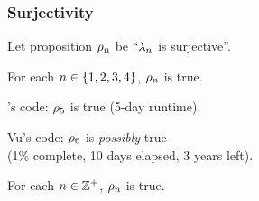 \documentclass[letterpaper, 14pt]{extarticle}
\begin{document}
\begin{flushleft}

\subsubsection{Surjectivity}

\begin{definition}
Let proposition $\rho_{n}$ be ``$\lambda_{n}$ is surjective''.
\end{definition}

\begin{remark}
For each $n \in \{1, 2, 3, 4\}$, $\rho_{n}$ is true.
\end{remark}

\begin{remark}
\cm's code: $\rho_{5}$ is true (5-day runtime).
\end{remark}

\begin{remark}
Vu's code: $\rho_{6}$ is \emph{possibly} true \\
(1\% complete, 10 days elapsed, 3 years left).
\end{remark}

\begin{conjecture}
For each $n \in \mathbb{Z}^+$, $\rho_{n}$ is true.
\end{conjecture}


\end{flushleft}
\end{document}
